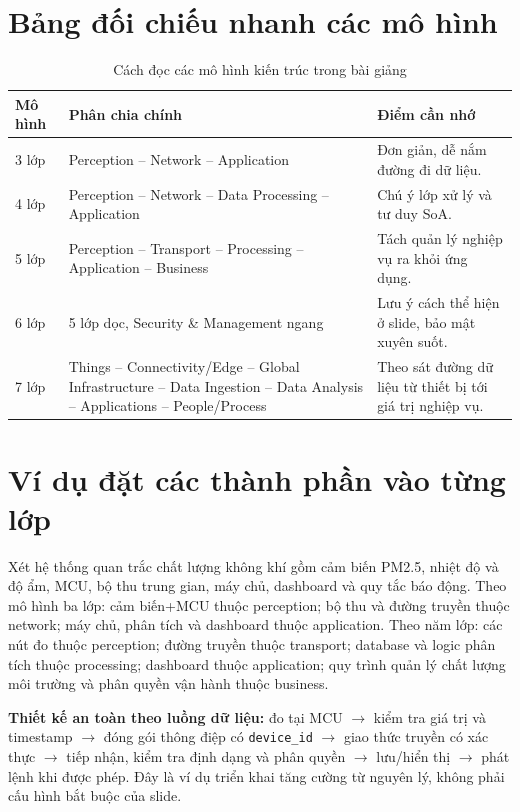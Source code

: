 \section{Bảng đối chiếu nhanh các mô hình}
\begin{table}[H]\centering\small
\caption{Cách đọc các mô hình kiến trúc trong bài giảng}
\begin{tabularx}{\textwidth}{p{1.5cm}Xp{3.9cm}}\toprule
Mô hình&Phân chia chính&Điểm cần nhớ\\\midrule
3 lớp&Perception -- Network -- Application&Đơn giản, dễ nắm đường đi dữ liệu.\\
4 lớp&Perception -- Network -- Data Processing -- Application&Chú ý lớp xử lý và tư duy SoA.\\
5 lớp&Perception -- Transport -- Processing -- Application -- Business&Tách quản lý nghiệp vụ ra khỏi ứng dụng.\\
6 lớp&5 lớp dọc, Security \& Management ngang&Lưu ý cách thể hiện ở slide, bảo mật xuyên suốt.\\
7 lớp&Things -- Connectivity/Edge -- Global Infrastructure -- Data Ingestion -- Data Analysis -- Applications -- People/Process&Theo sát đường dữ liệu từ thiết bị tới giá trị nghiệp vụ.\\\bottomrule
\end{tabularx}
\end{table}

\section{Ví dụ đặt các thành phần vào từng lớp}
Xét hệ thống quan trắc chất lượng không khí gồm cảm biến PM2.5, nhiệt độ và độ ẩm, MCU, bộ thu trung gian, máy chủ, dashboard và quy tắc báo động. Theo mô hình ba lớp: cảm biến+MCU thuộc perception; bộ thu và đường truyền thuộc network; máy chủ, phân tích và dashboard thuộc application. Theo năm lớp: các nút đo thuộc perception; đường truyền thuộc transport; database và logic phân tích thuộc processing; dashboard thuộc application; quy trình quản lý chất lượng môi trường và phân quyền vận hành thuộc business.

\begin{expandbox}
\textbf{Thiết kế an toàn theo luồng dữ liệu:} đo tại MCU $\rightarrow$ kiểm tra giá trị và timestamp $\rightarrow$ đóng gói thông điệp có \texttt{device\_id} $\rightarrow$ giao thức truyền có xác thực $\rightarrow$ tiếp nhận, kiểm tra định dạng và phân quyền $\rightarrow$ lưu/hiển thị $\rightarrow$ phát lệnh khi được phép. Đây là ví dụ triển khai tăng cường từ nguyên lý, không phải cấu hình bắt buộc của slide.
\end{expandbox}

